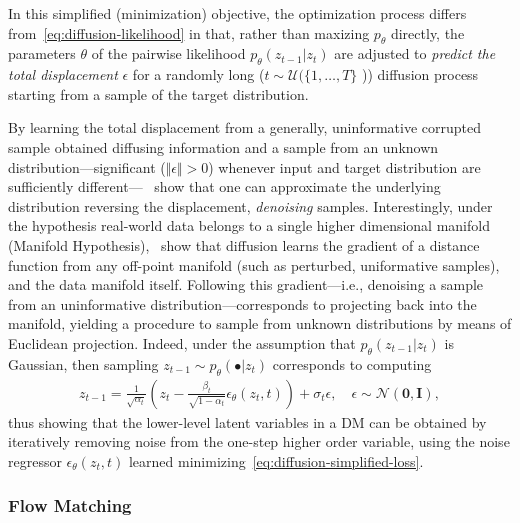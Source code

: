 In this simplified (minimization) objective, the optimization process differs from~\ref{eq:diffusion-likelihood} in that, rather than maxizing \( p_\theta \) directly, the parameters \( \theta \) of the pairwise likelihood \( p_\theta(z_{t-1} \vert z_t) \) are adjusted to \emph{predict the total displacement} \( \epsilon \) for a randomly long (\( t \sim \mathcal{U}(\{1,\dots,T\} \) )) diffusion process starting from a sample of the target distribution.

By learning the total displacement from a generally, uninformative corrupted sample obtained diffusing information and a sample from an unknown distribution---significant (\( \Vert \epsilon \Vert > 0 \)) whenever input and target distribution are sufficiently different---~\citet{hoDenoisingDiffusionProbabilistic2020} show that one can approximate the underlying distribution reversing the displacement, \emph{denoising} samples.
Interestingly, under the hypothesis real-world data belongs to a single higher dimensional manifold (Manifold Hypothesis),~\citet{permenterInterpretingImprovingDiffusion2024} show that diffusion learns the gradient of a distance function from any off-point manifold (such as perturbed, uniformative samples), and the data manifold itself.
Following this gradient---i.e., denoising a sample from an uninformative distribution---corresponds to projecting back into the manifold, yielding a procedure to sample from unknown distributions by means of Euclidean projection.
Indeed, under the assumption that \(p_\theta (z_{t-1} \vert z_t) \) is Gaussian, then sampling \(z_{t-1} \sim p_\theta(\bullet \vert z_{t}) \) corresponds to computing
\begin{align}
    z_{t-1} = \frac{1}{\sqrt{\alpha_t}} \left( z_t - \frac{\beta_t}{\sqrt{1 - \bar\alpha_t}} \epsilon_\theta(z_t, t) \right) + \sigma_t \epsilon, \quad \epsilon \sim \mathcal N(\mathbf{0}, \mathbf{I}), \label{eq:diffusion-denoising-definition}
\end{align}
thus showing that the lower-level latent variables in a DM can be obtained by iteratively removing noise from the one-step higher order variable, using the noise regressor \( \epsilon_\theta(z_t, t)\) learned minimizing~\ref{eq:diffusion-simplified-loss}.

\subsubsection{Flow Matching}
\label{sec:ch4-flow-matching}
 
